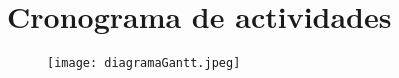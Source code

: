 \chapter{Cronograma de actividades}

    \begin{figure}[H]
        \centering
        \texttt{[image: diagramaGantt.jpeg]}
        \label{fig:fig10}
    \end{figure}